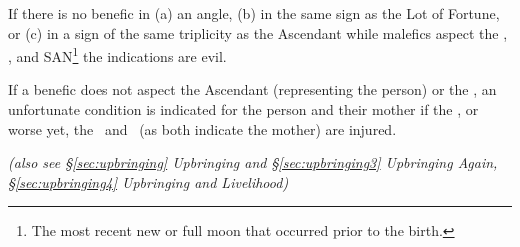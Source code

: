 If there is no benefic in (a) an angle, (b) in the same sign as the Lot of Fortune, or (c) in a sign of the same triplicity as the Ascendant while malefics aspect the \Sun, \Moon, and SAN\footnote{The most recent new or full moon that occurred prior to the birth.} the indications are evil.

If a benefic does not aspect the Ascendant (representing the person) or the \Moon, an unfortunate condition is indicated for the person and their mother if the \Moon, or worse yet, the \Moon\, and \Venus\, (as both indicate the mother) are injured.

\textsl{\small(also see \S\ref{sec:upbringing} Upbringing and \S\ref{sec:upbringing3} Upbringing Again, \S\ref{sec:upbringing4} Upbringing and Livelihood)}